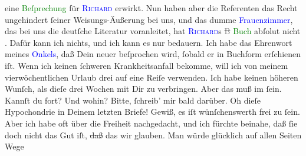 \documentclass[twoside=false,titlepage=false,open=any, parskip=never, fontsize=12pt, headings=small, chapterprefix=false, appendixprefix=false]{scrbook}
\newcommand{\strikeout}[1]{\sout{#1}}
\newcommand{\Theight}{\dimexpr\fontcharht\font`W}
\newcommand{\pbposition}{\depth}
\newcommand{\pb}{\nobreak\hspace{0pt}\raisebox{-0.1em}{\raisebox{\pbposition}{\textnormal{|}}}\nobreak\hspace{0pt}}
\newcommand{\introOben}{\textnormal{\raisebox{\Theight}{\raisebox{-\height}{\small{v}\normalsize}}}}
\begin{document}
               eine \textcolor{green}{Beſprechung}{} für \textsc{\textcolor{blue}{Richard}{}\ledrightnote{\textcolor{blue}{Richard Beer-Hofmann}}} erwirkt. Nun haben aber die Referenten das Recht ungehindert ſeiner
               Weisungs-Äußerung bei uns, und das dumme \textcolor{blue}{Frauenzimmer}{}, das bei uns die deutſche Literatur voranleitet,
               hat \textsc{\textcolor{blue}{Richard}{}\ledrightnote{\textcolor{blue}{Richard Beer-Hofmann}}}s \strikeout{\textcolor{gray}{B}}{ }\textcolor{green}{Buch}{} abſolut nicht \label{K_L02621-44v}\edtext{\textcolor{green}{ver{\pb}ſtanden}{}\ledrightnote{→\textcolor{green}{[?? Rezension von Beer-Hofmann: Novellen]}}}{\lemma{\textnormal{\emph{verſtanden}}}\Cendnote{\textnormal{XXXX}}}\label{K_L02621-44h}. Dafür kann ich nichts, und
               ich kann es nur bedauern. Ich habe das Ehrenwort meines \textcolor{blue}{Onkels}{}, daß Dein neuer \label{K_L02621-10v}\label{K_L02621-10h} beſprochen
               wird, ſobald er in Buchform erſchienen iſt.\pend
           \pstart
           Wenn ich keinen ſchweren Krankheitsanfall bekomme, will ich von meinem
               vierwöchentlichen Urlaub drei auf eine Reiſe verwenden. Ich habe keinen höheren
               Wunſch, als dieſe drei Wochen mit Dir zu verbringen. Aber das muß im \label{K_L02621-8v}\label{K_L02621-8h} ſein. Kannſt du fort?
               Und wohin? Bitte, ſchreib’ mir bald darüber.\pend
           \pstart
           {\pb}Oh dieſe Hypochondrie in Deinem letzten Briefe!
               Gewiß, es iſt wünſchenswerth frei zu ſein. Aber ich habe oft über die Freiheit
               nachgedacht, und ich fürchte beinahe, daß ſie doch nicht das Gut iſt, \strikeout{daß}{ }\introOben{}das\introOben{} wir glauben. Man würde glücklich auf allen Seiten Wege
\end{document}
